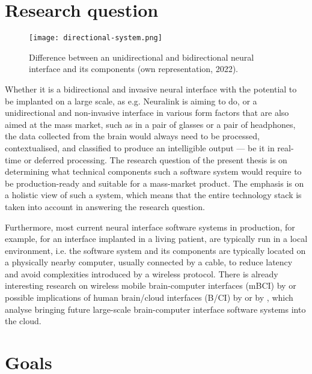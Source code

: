 \section{Research question}
\label{chapter1-research-question}

\begin{figure}[ht]
  \centering
  \texttt{[image: directional-system.png]}
  \caption{Difference between an unidirectional and bidirectional neural interface and its components (own representation, 2022).}
  \label{fig:directional-system}
\end{figure}

Whether it is a bidirectional and invasive neural interface with the potential to be implanted on a large scale, as e.g. Neuralink is aiming to do, or a unidirectional and non-invasive interface in various form factors that are also aimed at the mass market, such as in a pair of glasses or a pair of headphones, the data collected from the brain would always need to be processed, contextualised, and classified to produce an intelligible output — be it in real-time or deferred processing. The research question of the present thesis is on determining what technical components such a software system would require to be production-ready and suitable for a mass-market product. The emphasis is on a holistic view of such a system, which means that the entire technology stack is taken into account in answering the research question.

Furthermore, most current neural interface software systems in production, for example, for an interface implanted in a living patient, are typically run in a local environment, i.e. the software system and its components are typically located on a physically nearby computer, usually connected by a cable, to reduce latency and avoid complexities introduced by a wireless protocol. There is already interesting research on wireless mobile brain-computer interfaces (mBCI) by \citeauthor{minguillon_mobile_2017} \citeyearpar{minguillon_mobile_2017} or possible implications of human brain/cloud interfaces (B/CI) by \citeauthor{martins_human_2019} \citeyearpar{martins_human_2019} or by \citeauthor{angelica_cognitive_2021} \citeyearpar{angelica_cognitive_2021}, which analyse bringing future large-scale brain-computer interface software systems into the cloud.


\section{Goals}
\label{chapter1-goals}

